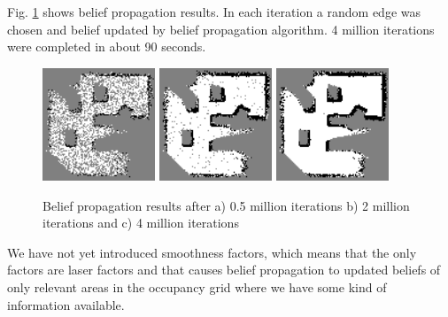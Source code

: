 \documentclass[10pt,oneside,letterpaper]{article}
\begin{document}
Fig. \ref{fig:bpresults} shows belief propagation results. In each iteration a random edge was chosen and belief updated by belief propagation algorithm. 4 million iterations were completed in about 90 seconds.
\begin{figure}
  \includegraphics[width=0.3\textwidth]{bpresults_100x100_50.png}
  \includegraphics[width=0.3\textwidth]{bpresults_100x100_200.png}
  \includegraphics[width=0.3\textwidth]{beliefpropagation_results_100x100.png}
  \caption{Belief propagation results after a) 0.5 million iterations b) 2 million iterations and c) 4 million iterations}
  \label{fig:bpresults}
\end{figure}

We have not yet introduced smoothness factors, which means that the only factors are laser factors and that causes belief propagation to updated beliefs of only relevant areas in the occupancy grid where we have some kind of information available.




\end{document}
